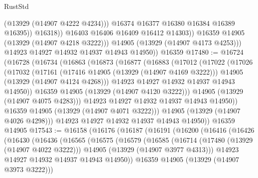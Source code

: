 \begin{lexlean}{RustStd}
\begin{coremodule}
{\begin{coremodule}
{{{{{{{{{{{{{{{{{{{{{{{{{{{{{{{{{{{{{                          (@13929 (@14907 @4222 @4234)))
                        @16374
                        @16377
                        @16380
                        @16384
                        @16389
                        @16395))
                    @16318))
                @16403
                @16406
                @16409
                @16412
                @14303))
            @16359
            @14905
            (@13929 (@14907 @4218 @3222)))
          @14905
          (@13929 (@14907 @4173 @4253)))
        @14923
        @14927
        @14932
        @14937
        @14943
        @14950))
    @16359
@17480 := @16724
    (@16728
      (@16734
        (@16863
          (@16873
            (@16877
              (@16883
                (@17012
                  (@17022
                    (@17026
                      (@17032
                        (@17161
                          (@17416 @14905 (@13929 (@14907 @4169 @3222)))
                          @14905
                          (@13929 (@14907 @4124 @4268)))
                        @14923
                        @14927
                        @14932
                        @14937
                        @14943
                        @14950))
                    @16359
                    @14905
                    (@13929 (@14907 @4120 @3222)))
                  @14905
                  (@13929 (@14907 @4075 @4283)))
                @14923
                @14927
                @14932
                @14937
                @14943
                @14950))
            @16359
            @14905
            (@13929 (@14907 @4071 @3222)))
          @14905
          (@13929 (@14907 @4026 @4298)))
        @14923
        @14927
        @14932
        @14937
        @14943
        @14950))
    @16359
    @14905
@17543 := @16158
    (@16176
      (@16187
        (@16191
          (@16200
            (@16416
              (@16426
                (@16430
                  (@16436
                    (@16565
                      (@16575
                        (@16579
                          (@16585
                            (@16714
                              (@17480 (@13929 (@14907 @4022 @3222)))
                              @14905
                              (@13929 (@14907 @3977 @4313)))
                            @14923
                            @14927
                            @14932
                            @14937
                            @14943
                            @14950))
                        @16359
                        @14905
                        (@13929 (@14907 @3973 @3222)))
}}}}}}}}}}}}}}}}}}}}}}}}}}}}}}}}}}}}}
\end{coremodule}}
\end{coremodule}
\end{lexlean}
